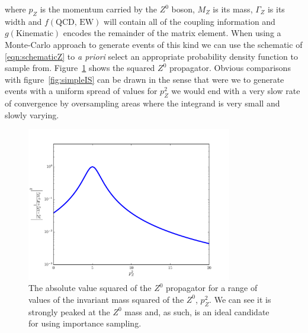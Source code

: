   	where $p_Z$ is the momentum carried by the $Z^0$ boson, $M_Z$ is its mass, $\Gamma_Z$ is its width and $f(\text{QCD, EW})$ will
  	contain all of the coupling information and $g(\text{Kinematic})$ encodes the remainder of the matrix element.  When using a
  	Monte-Carlo approach to generate events of this kind we can use the schematic of \ref{eqn:schematicZ} to \emph{a priori} select
  	an appropriate probability density function to sample from.  Figure~\ref{fig:breitWigner} shows the squared $Z^0$ propagator.
  	Obvious comparisons with figure~\ref{fig:simpleIS} can be drawn in the sense that were we to generate events with a uniform spread
  	of values for $p_Z^2$ we would end with a very slow rate of convergence by oversampling areas where the integrand is very small and slowly varying.

	\begin{figure}[htp]
		\centering
		\includegraphics[width=0.8\textwidth, height=0.6\textwidth]{breitWigner}
		\caption{The absolute value squared of the $Z^0$ propagator for a range of values of the invariant mass squared of the
		$Z^0$, $p_Z^2$.  We can see it is strongly peaked at the $Z^0$ mass and, as such, is an ideal candidate for using importance sampling.}
		\label{fig:breitWigner}
  	\end{figure}

